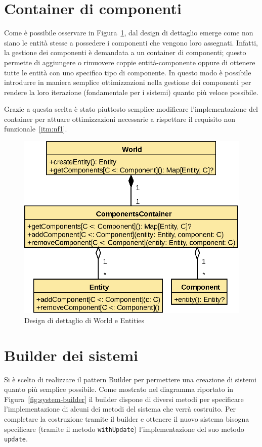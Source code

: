 

\section{Container di componenti}\label{sec:container-di-componenti}
Come è possibile osservare in Figura~\ref{fig:world-detail}, dal design di dettaglio emerge come
non siano le entità stesse a possedere i componenti che vengono loro assegnati.
Infatti, la gestione dei componenti è demandata a un container di componenti;
questo permette di aggiungere o rimuovere coppie entità-componente oppure di ottenere tutte le entità con uno specifico
tipo di componente.
In questo modo è possibile introdurre in maniera semplice ottimizzazioni nella gestione dei
componenti per rendere la loro iterazione (fondamentale per i sistemi) quanto più veloce possibile.

Grazie a questa scelta è stato piuttosto semplice modificare l'implementazione del container per attuare ottimizzazioni
necessarie a rispettare il requisito non funzionale~\ref{itm:nf1}.
\begin{figure}[H]
    \centering
    \includegraphics[width=\textwidth]{./img/WorldDetail}
    \caption{Design di dettaglio di World e Entities}
    \label{fig:world-detail}
\end{figure}

\section{Builder dei sistemi}\label{sec:builder-dei-sistemi}
Si è scelto di realizzare il pattern Builder per permettere una creazione di sistemi quanto più semplice possibile.
Come mostrato nel diagramma riportato in Figura~\ref{fig:system-builder} il builder dispone di diversi
metodi per specificare l'implementazione di alcuni dei metodi del sistema che verrà costruito.
Per completare la costruzione tramite il builder e ottenere il nuovo sistema bisogna specificare
(tramite il metodo \texttt{withUpdate}) l'implementazione del suo metodo \texttt{update}.

